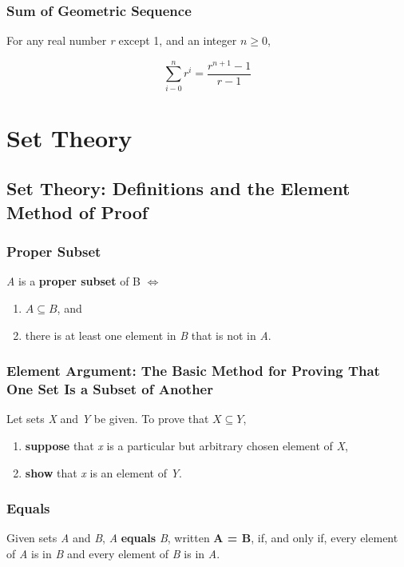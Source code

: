 \documentclass[12pt]{article}
\begin{document}
\subsubsection*{Sum of Geometric Sequence}
For any real number \textit{r} except 1, and an integer $n \geq 0$,

\begin{equation*}
\sum^{n}_{i-0} r^i = \frac{r^{n+1} - 1}{r - 1}
\end{equation*}

\section{Set Theory}
\subsection{Set Theory: Definitions and the Element Method of Proof}

\subsubsection*{Proper Subset}
\textit{A} is a \textbf{proper subset} of B $\Leftrightarrow$
\begin{enumerate}

\item $A \subseteq B$, and
\item there is at least one element in \textit{B} that is not in \textit{A}.

\end{enumerate}

\subsubsection*{Element Argument: The Basic Method for Proving That One Set Is a Subset of Another}
Let sets \textit{X} and \textit{Y} be given. To prove that $X \subseteq Y$,
\begin{enumerate}

\item \textbf{suppose} that \textit{x} is a particular but arbitrary chosen element of \textit{X},
\item \textbf{show} that \textit{x} is an element of \textit{Y}.

\end{enumerate}

\subsubsection*{Equals}
Given sets \textit{A} and \textit{B}, \textit{A} \textbf{equals} \textit{B}, written \textbf{A = B}, if, and only if, every element of \textit{A} is in \textit{B} and every element of \textit{B} is in \textit{A}.
\end{document}
